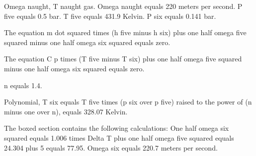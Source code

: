 Omega naught, T naught gas. Omega naught equals 220 meters per second. P five equals 0.5 bar. T five equals 431.9 Kelvin. P six equals 0.141 bar.

The equation m dot squared times (h five minus h six) plus one half omega five squared minus one half omega six squared equals zero.

The equation C p times (T five minus T six) plus one half omega five squared minus one half omega six squared equals zero.

n equals 1.4.

Polynomial, T six equals T five times (p six over p five) raised to the power of (n minus one over n), equals 328.07 Kelvin.

The boxed section contains the following calculations:
One half omega six squared equals 1.006 times Delta T plus one half omega five squared equals 24.304 plus 5 equals 77.95. Omega six equals 220.7 meters per second.